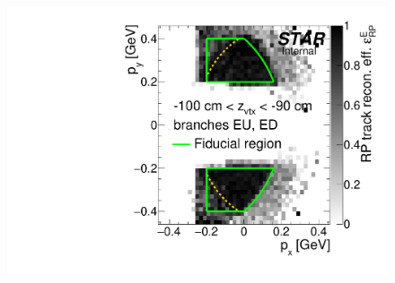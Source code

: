 \begin{figure}[hb]
{  \includegraphics[width=\linewidth,page=8]{graphics/corrections/mcEffPxPy.pdf}
}%
\end{figure}
